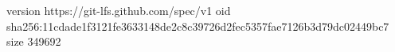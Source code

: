 version https://git-lfs.github.com/spec/v1
oid sha256:11cdade1f3121fe3633148de2c8c39726d2fec5357fae7126b3d79dc02449bc7
size 349692
